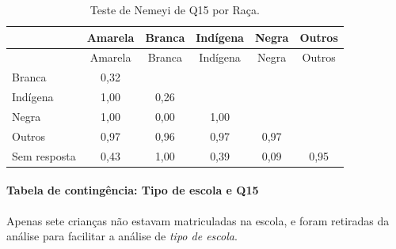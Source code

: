 \documentclass[]{article}
\let\oldparagraph\paragraph
\renewcommand{\paragraph}[1]{\oldparagraph{#1}\mbox{}}
\begin{document}
\begin{longtable}[]{@{}lccccc@{}}
\caption{\label{tab:unnamed-chunk-125}Teste de Nemeyi de Q15 por Raça.}\tabularnewline
\toprule
& Amarela & Branca & Indígena & Negra & Outros\tabularnewline
\midrule
\endfirsthead
\toprule
& Amarela & Branca & Indígena & Negra & Outros\tabularnewline
\midrule
\endhead
Branca & 0,32 & & & &\tabularnewline
Indígena & 1,00 & 0,26 & & &\tabularnewline
Negra & 1,00 & 0,00 & 1,00 & &\tabularnewline
Outros & 0,97 & 0,96 & 0,97 & 0,97 &\tabularnewline
Sem resposta & 0,43 & 1,00 & 0,39 & 0,09 & 0,95\tabularnewline
\bottomrule
\end{longtable}

\cleardoublepage

\hypertarget{tabela-de-continguxeancia-tipo-de-escola-e-q15}{%
\paragraph{Tabela de contingência: Tipo de escola e Q15}\label{tabela-de-continguxeancia-tipo-de-escola-e-q15}}

Apenas sete crianças não estavam matriculadas na escola, e foram retiradas da análise para facilitar a análise de \emph{tipo de escola}.
\end{document}
